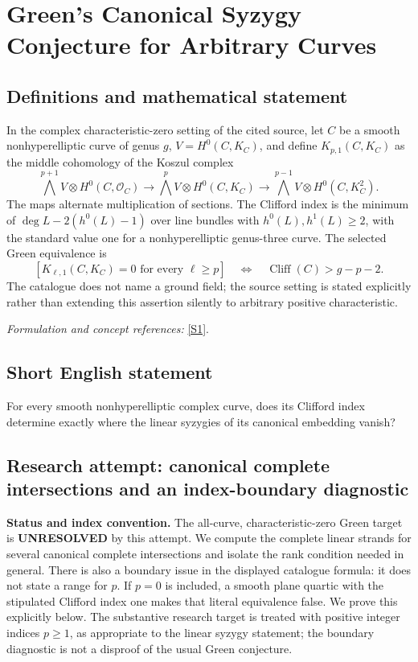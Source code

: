 \documentclass[11pt]{article}
\begin{document}
\section*{\texorpdfstring{Green’s Canonical Syzygy Conjecture for Arbitrary Curves}{Green’s Canonical Syzygy Conjecture for Arbitrary Curves}}\label{30003897}
\subsection{Definitions and mathematical statement}
In the complex characteristic-zero setting of the cited source, let $C$ be a smooth nonhyperelliptic curve of genus $g$, $V=H^0(C,K_C)$, and define $K_{p,1}(C,K_C)$ as the middle cohomology of the Koszul complex
\[
 \bigwedge^{p+1}V\otimes H^0(C,\mathcal O_C)
 \longrightarrow\bigwedge^pV\otimes H^0(C,K_C)
 \longrightarrow\bigwedge^{p-1}V\otimes H^0(C,K_C^2).
\]
The maps alternate multiplication of sections. The Clifford index is the minimum of $\deg L-2(h^0(L)-1)$ over line bundles with $h^0(L),h^1(L)\ge2$, with the standard value one for a nonhyperelliptic genus-three curve. The selected Green equivalence is
\[
 [K_{\ell,1}(C,K_C)=0\text{ for every }\ell\ge p]
 \quad\Longleftrightarrow\quad\operatorname{Cliff}(C)>g-p-2.
\]
The catalogue does not name a ground field; the source setting is stated explicitly rather than extending this assertion silently to arbitrary positive characteristic.
\par\smallskip\textit{Formulation and concept references:} \href{https://webusers.imj-prg.fr/~claire.voisin/Articlesweb/syzod.pdf}{[S1]}.

\subsection{Short English statement}
For every smooth nonhyperelliptic complex curve, does its Clifford index determine exactly where the linear syzygies of its canonical embedding vanish?
\subsection{Research attempt: canonical complete intersections and an index-boundary diagnostic}
\textbf{Status and index convention.} The all-curve, characteristic-zero Green target is \textbf{UNRESOLVED} by this attempt. We compute the complete linear strands for several canonical complete intersections and isolate the rank condition needed in general. There is also a boundary issue in the displayed catalogue formula: it does not state a range for $p$. If $p=0$ is included, a smooth plane quartic with the stipulated Clifford index one makes that literal equivalence false. We prove this explicitly below. The substantive research target is treated with positive integer indices $p\ge1$, as appropriate to the linear syzygy statement; the boundary diagnostic is not a disproof of the usual Green conjecture.
\end{document}
